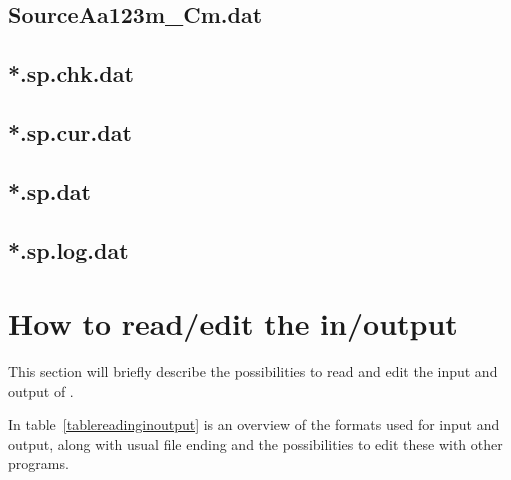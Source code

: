 \subsection{SourceAa123m\_Cm.dat}

\subsection{*.sp.chk.dat}

\subsection{*.sp.cur.dat}

\subsection{*.sp.dat}

\subsection{*.sp.log.dat}

\section{How to read/edit the in/output}
This section will briefly describe the possibilities to read and edit
the input and output of \neotwo.

In table~\ref{tablereadinginoutput} is an overview of the formats used
for input and output, along with usual file ending and the possibilities to
edit these with other programs.

